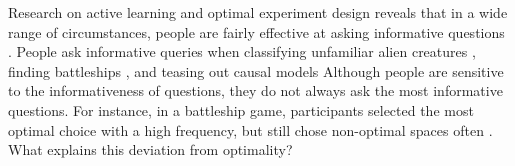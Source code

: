 \documentclass[10pt,letterpaper]{article}
\begin{document}


Research on active learning and optimal experiment design reveals that in a wide range of circumstances, people are fairly effective at asking informative questions \cite{coenen2019asking,NelsonFindingUsefulQuestions2005,GureckisSelfDirectedLearningCognitive2012}.
People ask informative queries when classifying unfamiliar alien creatures \cite{NelsonFindingUsefulQuestions2005}, finding battleships \cite{GureckisActiveLearningStrategies2009}, and teasing out causal models \cite{steyvers2003inferring,cook2011science} %
Although people are sensitive to the informativeness of questions, they do not always ask the most informative questions. 
For instance, in a battleship game, participants selected the most optimal choice with a high frequency, but still chose non-optimal spaces often \cite{GureckisActiveLearningStrategies2009}.
What explains this deviation from optimality? 
\end{document}
